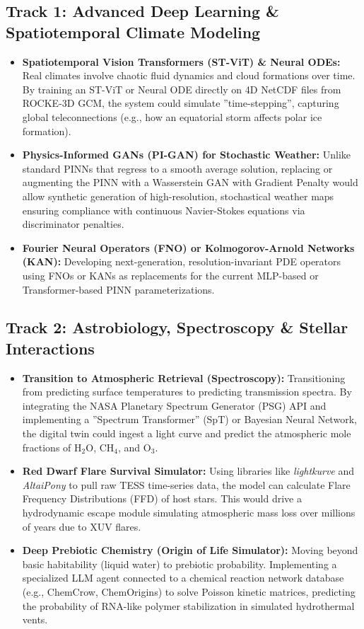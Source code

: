 \documentclass[12pt,a4paper]{article}
\begin{document}
\subsection{Track 1: Advanced Deep Learning \& Spatiotemporal Climate Modeling}
\begin{itemize}
    \item \textbf{Spatiotemporal Vision Transformers (ST-ViT) \& Neural ODEs:} Real climates involve chaotic fluid dynamics and cloud formations over time. By training an ST-ViT or Neural ODE directly on 4D NetCDF files from ROCKE-3D GCM, the system could simulate ''time-stepping'', capturing global teleconnections (e.g., how an equatorial storm affects polar ice formation).
    \item \textbf{Physics-Informed GANs (PI-GAN) for Stochastic Weather:} Unlike standard PINNs that regress to a smooth average solution, replacing or augmenting the PINN with a Wasserstein GAN with Gradient Penalty would allow synthetic generation of high-resolution, stochastical weather maps ensuring compliance with continuous Navier-Stokes equations via discriminator penalties.
    \item \textbf{Fourier Neural Operators (FNO) or Kolmogorov-Arnold Networks (KAN):} Developing next-generation, resolution-invariant PDE operators using FNOs or KANs as replacements for the current MLP-based or Transformer-based PINN parameterizations.
\end{itemize}

\subsection{Track 2: Astrobiology, Spectroscopy \& Stellar Interactions}
\begin{itemize}
    \item \textbf{Transition to Atmospheric Retrieval (Spectroscopy):} Transitioning from predicting surface temperatures to predicting transmission spectra. By integrating the NASA Planetary Spectrum Generator (PSG) API and implementing a ''Spectrum Transformer'' (SpT) or Bayesian Neural Network, the digital twin could ingest a light curve and predict the atmospheric mole fractions of $\text{H}_2\text{O}$, $\text{CH}_4$, and $\text{O}_3$.
    \item \textbf{Red Dwarf Flare Survival Simulator:} Using libraries like \textit{lightkurve} and \textit{AltaiPony} to pull raw TESS time-series data, the model can calculate Flare Frequency Distributions (FFD) of host stars. This would drive a hydrodynamic escape module simulating atmospheric mass loss over millions of years due to XUV flares.
    \item \textbf{Deep Prebiotic Chemistry (Origin of Life Simulator):} Moving beyond basic habitability (liquid water) to prebiotic probability. Implementing a specialized LLM agent connected to a chemical reaction network database (e.g., ChemCrow, ChemOrigins) to solve Poisson kinetic matrices, predicting the probability of RNA-like polymer stabilization in simulated hydrothermal vents.
\end{itemize}
\end{document}
